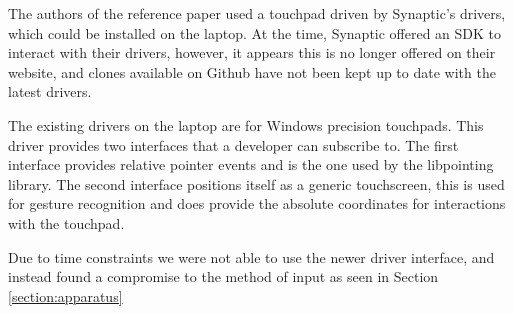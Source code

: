 The authors of the reference paper used a touchpad driven by Synaptic's drivers, which could be installed on the laptop. At the time, Synaptic offered an SDK to interact with their drivers, however, it appears this is no longer offered on their website, and clones available on Github have not been kept up to date with the latest drivers.

The existing drivers on the laptop are for Windows precision touchpads. This driver provides two interfaces that a developer can subscribe to\cite{PrecisionGuide}. The first interface provides relative pointer events and is the one used by the libpointing library. The second interface positions itself as a generic touchscreen\cite{WindowsWindows}, this is used for gesture recognition and does provide the absolute coordinates for interactions with the touchpad.

Due to time constraints we were not able to use the newer driver interface, and instead found a compromise to the method of input as seen in Section \ref{section:apparatus}

